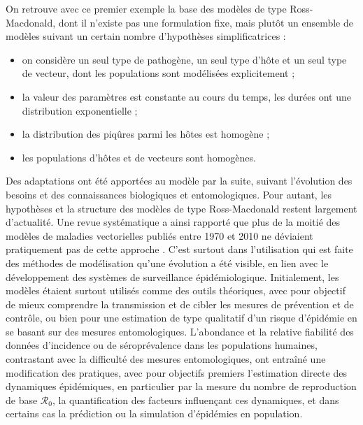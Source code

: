 On retrouve avec ce premier exemple la base des modèles de type Ross-Macdonald, dont il n'existe pas une formulation fixe, mais plutôt un ensemble de modèles suivant un certain nombre d'hypothèses simplificatrices \cite{smith2012ross} : 
\begin{itemize}
\item on considère un seul type de pathogène, un seul type d'hôte et un seul type de vecteur, dont les populations sont modélisées explicitement ;
\item la valeur des paramètres est constante au cours du temps, les durées ont une distribution exponentielle ;
\item la distribution des piqûres parmi les hôtes est homogène ;
\item les populations d'hôtes et de vecteurs sont homogènes.
\end{itemize}
Des adaptations ont été apportées au modèle par la suite, suivant l'évolution des besoins et des connaissances biologiques et entomologiques.
Pour autant, les hypothèses et la structure des modèles de type Ross-Macdonald restent largement d'actualité. 
Une revue systématique a ainsi rapporté que plus de la moitié des modèles de maladies vectorielles publiés entre 1970 et 2010 ne déviaient pratiquement pas de cette approche \cite{reiner_systematic_2013}.
C'est surtout dans l'utilisation qui est faite des méthodes de modélisation qu'une évolution a été visible, en lien avec le développement des systèmes de surveillance épidémiologique.
Initialement, les modèles étaient surtout utilisés comme des outils théoriques, avec pour objectif de mieux comprendre la transmission et de cibler les mesures de prévention et de contrôle, ou bien pour une estimation de type qualitatif d'un risque d'épidémie en se basant sur des mesures entomologiques.
L'abondance et la relative fiabilité des données d'incidence ou de séroprévalence dans les populations humaines, contrastant avec la difficulté des mesures entomologiques, ont entraîné une modification des pratiques, avec pour objectifs premiers l'estimation directe des dynamiques épidémiques, en particulier par la mesure du nombre de reproduction de base $\mathcal{R}_0$, la quantification des facteurs influençant ces dynamiques, et dans certains cas la prédiction ou la simulation d'épidémies en population.

